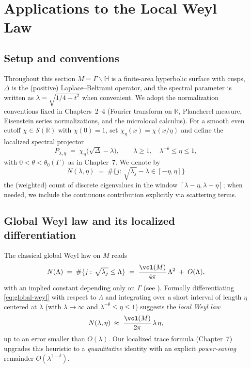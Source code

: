 
\section{Applications to the Local Weyl Law}\label{sec:apps-weyl}

\subsection{Setup and conventions}
Throughout this section $M=\Gamma\backslash\mathbb{H}$ is a finite-area hyperbolic surface with cusps, $\Delta$ is the (positive) Laplace--Beltrami operator, and the spectral parameter is written as $\lambda=\sqrt{1/4+t^2}$ when convenient. We adopt the normalization conventions fixed in Chapters~2–4 (Fourier transform on $\mathbb{R}$, Plancherel measure, Eisenstein series normalizations, and the microlocal calculus). For a smooth even cutoff $\chi\in\mathcal{S}(\mathbb{R})$ with $\chi(0)=1$, set $\chi_\eta(x)=\chi(x/\eta)$ and define the localized spectral projector
\[
P_{\lambda,\eta} \;=\; \chi_\eta\!\big(\sqrt{\Delta}-\lambda\big),
\qquad \lambda\ge 1,\quad \lambda^{-\theta}\le \eta\le 1,
\]
with $0<\theta<\theta_0(\Gamma)$ as in Chapter~7. We denote by
\[
N(\lambda,\eta)\;=\; \#\big\{j:\, \sqrt{\lambda_j}-\lambda\in[-\eta,\eta]\big\}
\]
the (weighted) count of discrete eigenvalues in the window $[\lambda-\eta,\lambda+\eta]$; when needed, we include the continuous contribution explicitly via scattering terms.

\subsection{Global Weyl law and its localized differentiation}
The classical global Weyl law on $M$ reads
\begin{equation}\label{eq:global-weyl}
N(\Lambda)\;=\;\#\{j:\, \sqrt{\lambda_j}\le \Lambda\}
\;=\; \frac{\vol(M)}{4\pi}\,\Lambda^{2} \;+\; O(\Lambda),
\end{equation}
with an implied constant depending only on $\Gamma$ (see \cite{Selberg1956, DG1975, Hejhal1983, Iwaniec2002}). Formally differentiating \eqref{eq:global-weyl} with respect to $\Lambda$ and integrating over a short interval of length $\eta$ centered at $\lambda$ (with $\lambda\to\infty$ and $\lambda^{-\theta}\le \eta\le 1$) suggests the \emph{local Weyl law}
\[
N(\lambda,\eta)\;\approx\;\frac{\vol(M)}{2\pi}\,\lambda\,\eta,
\]
up to an error smaller than $O(\lambda)$. Our localized trace formula (Chapter~7) upgrades this heuristic to a \emph{quantitative} identity with an explicit \emph{power-saving} remainder $O(\lambda^{1-\delta})$.

